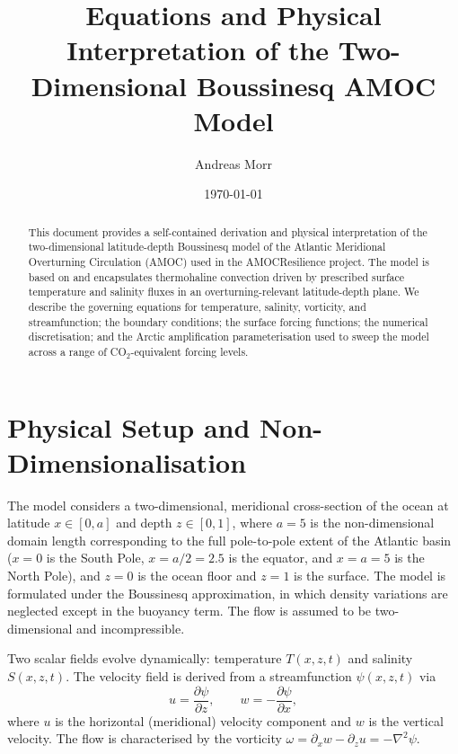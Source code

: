 \documentclass[12pt, a4paper]{article}
\newcommand{\CO}{CO\ensuremath{_2}}
\newcommand{\pd}[2]{\frac{\partial #1}{\partial #2}}
\newcommand{\lap}{\nabla^2}
\begin{document}
\title{Equations and Physical Interpretation of the
       Two-Dimensional Boussinesq AMOC Model}

\author{Andreas Morr}
\date{\today}
\maketitle

\begin{abstract}
This document provides a self-contained derivation and physical interpretation
of the two-dimensional latitude-depth Boussinesq model of the Atlantic
Meridional Overturning Circulation (AMOC) used in the AMOCResilience project.
The model is based on \citet{Soons2025Boussinesq} and encapsulates thermohaline
convection driven by prescribed surface temperature and salinity fluxes in an
overturning-relevant latitude-depth plane. We describe the governing equations
for temperature, salinity, vorticity, and streamfunction; the boundary
conditions; the surface forcing functions; the numerical discretisation; and
the Arctic amplification parameterisation used to sweep the model across a
range of \CO{}-equivalent forcing levels.
\end{abstract}

\tableofcontents
\newpage

\section{Physical Setup and Non-Dimensionalisation}
\label{sec:setup}

The model considers a two-dimensional, meridional cross-section of the ocean
at latitude $x \in [0, a]$ and depth $z \in [0, 1]$, where $a = 5$ is the
non-dimensional domain length corresponding to the full pole-to-pole extent
of the Atlantic basin ($x = 0$ is the South Pole, $x = a/2 = 2.5$ is the
equator, and $x = a = 5$ is the North Pole), and $z = 0$ is the ocean floor
and $z = 1$ is the surface. The model is formulated under the Boussinesq approximation, in which
density variations are neglected except in the buoyancy term. The flow is
assumed to be two-dimensional and incompressible.

Two scalar fields evolve dynamically: temperature $T(x,z,t)$ and salinity
$S(x,z,t)$. The velocity field is derived from a streamfunction $\psi(x,z,t)$
via
\begin{equation}
  u = \pd{\psi}{z}, \qquad w = -\pd{\psi}{x},
  \label{eq:vel}
\end{equation}
where $u$ is the horizontal (meridional) velocity component and $w$ is the
vertical velocity. The flow is characterised by the vorticity
$\omega = \partial_x w - \partial_z u = -\lap\psi$.
\end{document}
